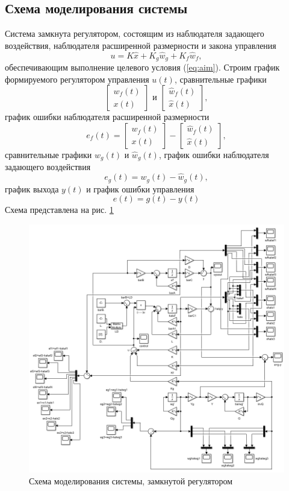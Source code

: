 \documentclass[a4paper, 12pt]{article}
\begin{document}
    \subsection{Схема моделирования системы}
    Система замкнута регулятором,
    состоящим из наблюдателя задающего воздействия,
    наблюдателя расширенной размерности
    и закона управления
    $$
    u=K\hat{x}+K_g\hat{w}_g+K_f\hat{w}_f,
    $$
    обеспечивающим выполнение целевого условия (\ref{eq:aim}).
    Строим график формируемого регулятором
    управления $u(t)$, сравнительные графики
    $$
    \begin{bmatrix}
        w_f(t)\\x(t)
    \end{bmatrix}\text{ и }\begin{bmatrix}
        \hat{w}_f(t)\\ \hat{x}(t)
    \end{bmatrix},
    $$
    график ошибки наблюдателя расширенной размерности
    $$
    e_f(t)=\begin{bmatrix}
        w_f(t)\\x(t)
    \end{bmatrix}-\begin{bmatrix}
        \hat{w}_f(t)\\ \hat{x}(t)
    \end{bmatrix},
    $$
    сравнительные графики $w_g(t)$ и $\hat{w}_g(t)$, график
    ошибки наблюдателя задающего воздействия $$e_g(t)=w_g(t)-\hat{w}_g(t),$$
    график выхода $y(t)$ и график ошибки управления $$e(t)=g(t)-y(t)$$
    Схема представлена на рис. \ref{fig:2task_scheme}
    \begin{figure}[H]
        \centering
        \includegraphics[scale=0.75]{2task_scheme.png}
        \captionsetup{skip=0pt}
        \caption{Схема моделирования системы, замкнутой регулятором}
        \label{fig:2task_scheme}
    \end{figure}
\end{document}
